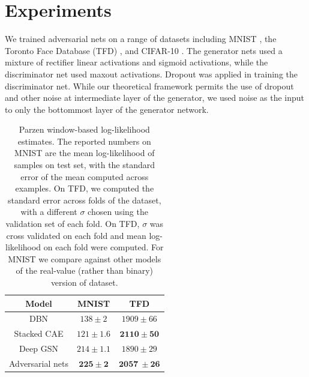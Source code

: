 \section{Experiments}

We trained adversarial nets on
a range of datasets including MNIST \cite{23_lecun1998gradient}, the Toronto Face Database (TFD) \cite{28_susskind2010toronto}, and CIFAR-10 \cite{21_krizhevsky2009learning}. The generator nets used a mixture of rectifier linear activations \cite{19_5459469,9_pmlr-v15-glorot11a} and sigmoid activations, while the discriminator net used maxout \cite{10_goodfellow2013maxoutnetworks} activations. Dropout \cite{17_hinton2012improvingneuralnetworkspreventing} was applied in training the discriminator net. While our theoretical framework permits the use of dropout and other noise at intermediate layer of the generator, we used noise as the input to only the bottommost layer of the generator network.

\begin{table}[ht]
	\centering
	\begin{tabular}{c|c|c}
		Model & MNIST & TFD\\
		\hline
		DBN \cite{3_pmlr-v28-bengio13} & $138 \pm 2$ & $1909 \pm 66$\\
		Stacked CAE \cite{3_pmlr-v28-bengio13} & $121 \pm 1.6$ & $\boldsymbol{2110 \pm 50}$\\
		Deep GSN \cite{6_pmlr-v32-bengio14} & $214 \pm 1.1$ & $1890 \pm 29$\\
		Adversarial nets & $\boldsymbol{225 \pm 2}$ & $\boldsymbol{2057\ \pm 26}$\\
	\end{tabular}
	\caption{Parzen window-based log-likelihood estimates. The reported numbers on MNIST are the mean log-likelihood of samples on test set, with the standard error of the mean computed across examples. On TFD, we computed the standard error across folds of the dataset, with a different $\sigma$ chosen using the validation set of each fold. On TFD, $\sigma$ was cross validated on each fold and mean log-likelihood on each fold were computed. For MNIST we compare against other models of the real-value (rather than binary) version of dataset.}
	\label{tab: table 1}
\end{table}

